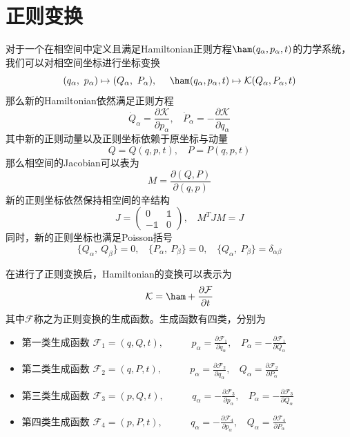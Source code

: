 \section{正则变换}
\label{sec:cannoical_transf}
对于一个在相空间中定义且满足Hamiltonian正则方程$\ham(q_\alpha,p_\alpha,t)$的力学系统，我们可以对相空间坐标进行坐标变换
\begin{equation}
    (q_\alpha,~p_\alpha)\mapsto (Q_\alpha,~P_\alpha),~~~~\ham(q_\alpha,p_\alpha,t)\mapsto \mathcal{K}(Q_\alpha,P_\alpha,t)
\end{equation}
那么新的Hamiltonian依然满足正则方程
\begin{equation}
    \dot Q_\alpha = \frac{\partial \mathcal{K}}{\partial p_\alpha},~~~~\dot P_\alpha = -\frac{\partial\mathcal{K}}{\partial q_\alpha}
\end{equation}
其中新的正则动量以及正则坐标依赖于原坐标与动量
\begin{equation}
    Q = Q(q,p,t),~~~~P=P(q,p,t)
\end{equation}
那么相空间的Jacobian可以表为
\begin{equation}
    M = \frac{\partial(Q,P)}{\partial(q,p)}
\end{equation}
新的正则坐标依然保持相空间的辛结构
\begin{equation}
    J = \begin{pmatrix}
        0&  \mathbb{1}\\
        -\mathbb{1}& 0
    \end{pmatrix},~~~~M^T J M = J
\end{equation}
同时，新的正则坐标也满足Poisson括号
\begin{equation}
    \{Q_\alpha,~Q_\beta\} = 0, ~~~~\{P_\alpha,~P_\beta\} = 0, ~~~~\{Q_\alpha,~P_\beta\} = \delta_{\alpha\beta}
\end{equation}

在进行了正则变换后，Hamiltonian的变换可以表示为
\begin{equation}
    \mathcal{K} = \ham + \frac{\partial\mathcal{F}}{\partial t}
\end{equation}
其中$\mathcal{F}$称之为正则变换的生成函数。生成函数有四类，分别为
\begin{itemize}
    \item {第一类生成函数} $\displaystyle \mathcal{F}_1=(q,Q,t),\qquad ~~~~ p_\alpha = \frac{\partial\mathcal{F}_1}{\partial q_\alpha},~~~~P_\alpha = -\frac{\partial\mathcal{F}_1}{\partial Q_\alpha}$
    \item {第二类生成函数} $\displaystyle \mathcal{F}_2=(q,P,t),\qquad ~~~~ p_\alpha = \frac{\partial\mathcal{F}_2}{\partial q_\alpha},~~~~Q_\alpha = \frac{\partial\mathcal{F}_2}{\partial P_\alpha}$
    \item {第三类生成函数} $\displaystyle \mathcal{F}_3=(p,Q,t),\qquad ~~~~ q_\alpha = -\frac{\partial\mathcal{F}_3}{\partial p_\alpha},~~~~P_\alpha =- \frac{\partial\mathcal{F}_3}{\partial Q_\alpha}$
    \item {第四类生成函数} $\displaystyle \mathcal{F}_4=(p,P,t),\qquad ~~~~ q_\alpha = -\frac{\partial\mathcal{F}_4}{\partial p_\alpha},~~~~Q_\alpha = \frac{\partial\mathcal{F}_4}{\partial P_\alpha}$
\end{itemize}


